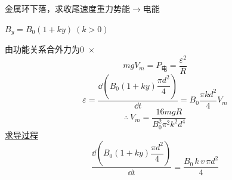 \begin{problem}[2]

金属环下落，求收尾速度\quad {}重力势能$\to$电能

$B_y=B_0(1+ky)\ (k>0)$
\begin{solution}
由功能关系\qquad 合外力为0\ $\times$ %
\[mgV_m=P_{\text{电}}=\frac{\varepsilon^2}{R}\]
\[\varepsilon=\frac{\dd\left(B_0(1+ky)\dfrac{\pi d^2}{4}\right)}{\dd t}=B_0\frac{\pi kd^2}{4}V_m\]
\[\therefore\ V_m=\frac{16mgR}{B_0^2\pi^2k^2d^4}\]
\underline{求导过程}
\[\frac{\dd\left(B_0(1+ky)\dfrac{\pi d^2}{4}\right)}{\dd t}=\frac{B_0\,k\,v\,\pi d^2}{4}\]
\end{solution}
\end{problem}
